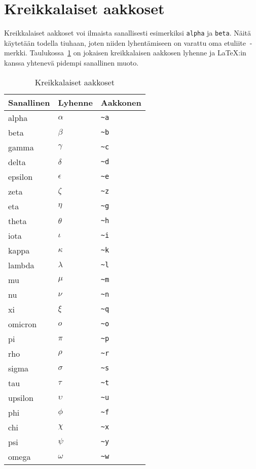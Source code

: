 

\section{Kreikkalaiset aakkoset}
Kreikkalaiset aakkoset voi ilmaista sanallisesti esimerkiksi \verb$alpha$ ja \verb$beta$.
Näitä käytetään todella tiuhaan, joten niiden lyhentämiseen on varattu oma etuliite $~$-merkki.
Taulukossa~\ref{tbl:greek} on jokaisen kreikkalaisen aakkosen lyhenne ja LaTeX:in kanssa yhtenevä pidempi sanallinen muoto.

\begin{table}[h!]
\begin{tabular}{ l | l | l }
Sanallinen & Lyhenne & Aakkonen \\ \hline
alpha & $\alpha$ & \verb$~a$ \\
beta & $\beta$ & \verb$~b$ \\
gamma & $\gamma$ & \verb$~c$ \\
delta & $\delta$ & \verb$~d$ \\
epsilon & $\epsilon$ & \verb$~e$ \\
zeta & $\zeta$ & \verb$~z$ \\
eta & $\eta$ & \verb$~g$ \\
theta & $\theta$ & \verb$~h$ \\
iota & $\iota$ & \verb$~i$ \\
kappa & $\kappa$ & \verb$~k$ \\
lambda & $\lambda$ & \verb$~l$ \\
mu & $\mu$ & \verb$~m$ \\
nu & $\nu$ & \verb$~n$ \\
xi & $\xi$ & \verb$~q$ \\
omicron & $o$ & \verb$~o$ \\
pi & $\pi$ & \verb$~p$ \\
rho & $\rho$ & \verb$~r$ \\
sigma & $\sigma$ & \verb$~s$ \\
tau & $\tau$ & \verb$~t$ \\
upsilon & $\upsilon$ & \verb$~u$ \\
phi & $\phi$ & \verb$~f$ \\
chi & $\chi$ & \verb$~x$ \\
psi & $\psi$ & \verb$~y$ \\
omega & $\omega$ & \verb$~w$ \\
\end{tabular}
\caption{Kreikkalaiset aakkoset}
\label{tbl:greek}
\end{table}

